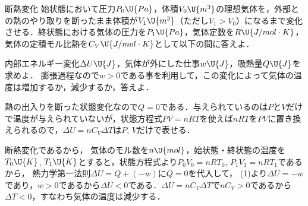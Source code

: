 \begin{reidaiunit}
\begin{reidai}{断熱変化}
\hspace{1zw}始状態において圧力$P_0\U{Pa}$，体積$V_0\U{m^3}$の理想気体を，外部との熱のやり取りを断ったまま体積が$V_1\U{m^3}$（ただし$V_1>V_0$）になるまで変化させる．終状態における気体の圧力を$P_1\U{Pa}$，気体定数を$R\U{J/mol\cdot K}$，気体の定積モル比熱を$C_V\U{J/mol\cdot K}$として以下の問に答えよ．
\begin{komon}
 内部エネルギー変化$\Delta U\U{J}$，気体が外にした仕事$w\U{J}$，吸熱量$Q\U{J}$を求めよ．
 膨張過程なので$w>0$である事を利用して，この変化によって気体の温度は増加するか，減少するか，答えよ．
\end{komon}
\end{reidai}

\begin{sisinE}
熱の出入りを断った状態変化なので$Q=0$である．与えられているのは$P$と$V$だけで温度が与えられていないが，状態方程式$PV=nRT$を使えば$nRT$を$PV$に置き換えられるので，$\Delta U=nC_V\Delta T$は$P$, $V$だけで表せる．
\end{sisinE}

\begin{kaitou}
\begin{komon}
 断熱変化であるから，
       気体のモル数を$n\U{mol}$，始状態・終状態の温度を$T_0\U{K}$, $T_1\U{K}$とすると，状態方程式より$P_0V_0=nRT_0$, $P_1V_1=nRT_1$であるから，
       熱力学第一法則$\Delta U=Q+(-w)$に$Q=0$を代入して，
 (1)より$\Delta U=-w$であり，$w>0$であるから$\Delta U<0$である．$\Delta U=nC_V\Delta T$で$nC_V>0$であるから$\Delta T<0$，すなわち気体の温度は{\gtfamily 減少する}．\hspace*{\fill}\Ans
\end{komon}
\end{kaitou}
\end{reidaiunit}

